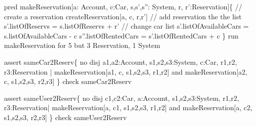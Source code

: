 \documentclass[a4paper]{article}
\begin{document}
pred makeReservation[a: Account, c:Car, s,s',s'': System, r, r':Reservation]\{ \newline
\hspace*{5 mm}		// create a reservation \newline
\hspace*{5 mm}		createReservation[a, c, r,r']  \newline
\hspace*{5 mm}		// add reservation the the list \newline	
\hspace*{5 mm}		s'.listOfReservs = s.listOfReservs + r' \newline
\hspace*{5 mm}		// change car list  \newline
\hspace*{5 mm}		s'.listOfAvailableCars = s.listOfAvailableCars - c \newline
\hspace*{5 mm}		s''.listOfRentedCars = s'.listOfRentedCars + c \newline
\} \newline
run makeReservation for 5 but 3 Reservation, 1 System  \newline

assert sameCar2Reserv\{ \newline
\hspace*{5 mm}		no disj a1,a2:Account, s1,s2,s3:System, c:Car, r1,r2, r3:Reservation | \newline
\hspace*{5 mm}			makeReservation[a1, c, s1,s2,s3, r1,r2] and makeReservation[a2, c, s1,s2,s3, r2,r3] \newline
\} \newline
check sameCar2Reserv \newline

assert sameUser2Reserv\{ \newline
\hspace*{5 mm}		no disj c1,c2:Car, a:Account, s1,s2,s3:System, r1,r2, r3:Reservation| \newline
\hspace*{5 mm}			makeReservation[a, c1, s1,s2,s3, r1,r2] and makeReservation[a, c2, \hspace*{5 mm}	s1,s2,s3, r2,r3] \newline
\} \newline
check sameUser2Reserv \newline
\end{document}
